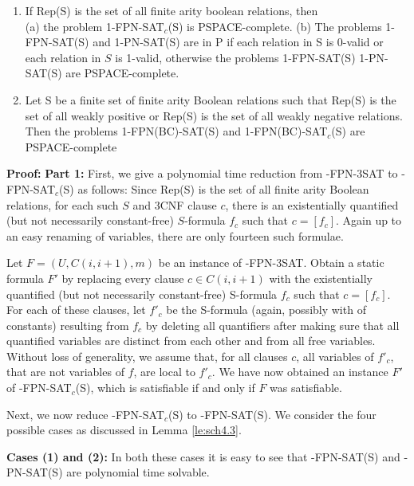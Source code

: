 \begin{theorem}\label{th:hsatshard}
\begin{enumerate}
\item
If Rep(S) is the set of all finite arity boolean relations, then\\
(a) the problem 1-FPN-SAT$_c$(S) is PSPACE-complete.
(b) The problems 1-FPN-SAT(S) and 1-PN-SAT(S) are  in P if each relation
in S is 0-valid or each relation in $S$ is 1-valid, otherwise
the problems 1-FPN-SAT(S) 1-PN-SAT(S) are  PSPACE-complete.
\item
Let S be a finite set of finite arity Boolean relations such that
Rep(S) is the set of all weakly positive or Rep(S) is the set
of all weakly negative relations. Then
the problems 1-FPN(BC)-SAT(S) and 1-FPN(BC)-SAT$_c$(S) are PSPACE-complete
\end{enumerate}
\end{theorem}

\noindent
{\bf Proof:}
{\bf  Part 1:}
First, we give a polynomial time reduction 
from {-FPN-3SAT} to {-FPN-SAT$_c$(S)} as follows:
Since {\sf Rep(S)} is the set of all finite arity Boolean relations,
for each such $S$ and 3CNF clause $c$,
there is an existentially quantified (but not necessarily constant-free)
$S$-formula $f_c$ such that $c=[f_c]$.
Again up to an easy renaming of variables, there are only fourteen such
formulae.

Let $F = (U, C(i, i+1), m)$ be an instance of {-FPN-3SAT}. 
Obtain a static  formula $F'$
by replacing every clause $c \in C(i, i+1)$ with the 
existentially quantified (but not necessarily constant-free)
{\sf S}-formula $f_c$ such that $c=[f_c]$. For each of these clauses,
let $f'_c$ be the {\sf S}-formula (again, possibly with
of constants) resulting from $f_{c}$ by deleting
all quantifiers after making sure that all quantified variables are
distinct from each other and from all free variables.  Without loss of
generality, we assume that, for all clauses $c$,
all variables of $f'_c$, that are not variables
of $f$, are local to $f'_c$.
We have now obtained an instance $F'$ of {-FPN-SAT$_c$(S)}, 
which is satisfiable if and only if $F$ was satisfiable.

\noindent
Next, we now reduce {-FPN-SAT$_c$(S)} to {-FPN-SAT(S)}. 
We consider the four possible cases as discussed in Lemma \ref{le:sch4.3}.


\noindent
{\bf Cases (1) and (2):} 
In both these cases it is easy to see that {-FPN-SAT(S)}  and
{-PN-SAT(S)} are  polynomial time solvable.\\

